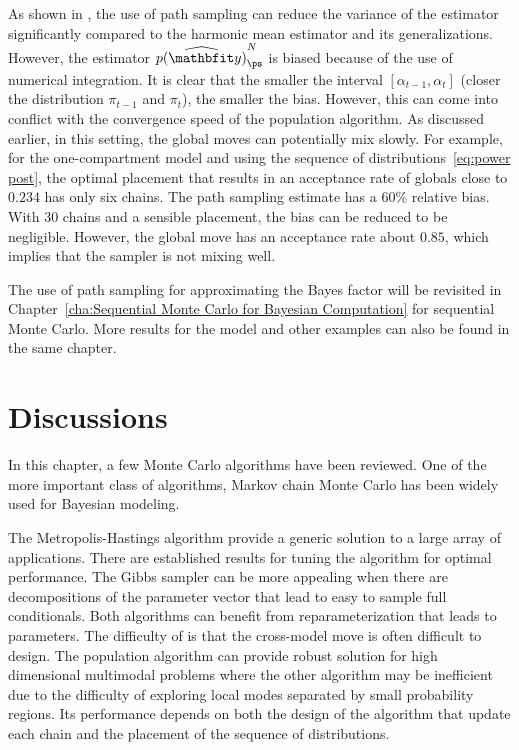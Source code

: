 As shown in \cite{Calderhead:2009bd}, the use of path sampling can reduce the variance of the estimator significantly compared to the harmonic mean estimator and its generalizations. However, the estimator $\widehat{p(\data)}_{\ps}^N$ is biased because of the use of numerical integration. It is clear that the smaller the interval $[\alpha_{t-1},\alpha_t]$ (closer the distribution $\pi_{t-1}$ and $\pi_t$), the smaller the bias. However, this can come into conflict with the convergence speed of the population \mcmc algorithm. As discussed earlier, in this setting, the global moves can potentially mix slowly. For example, for the one-compartment \pet model and using the sequence of distributions~\eqref{eq:power post}, the optimal placement that results in an acceptance rate of globals close to $0.234$ has only six chains. The path sampling estimate has a 60\% relative bias. With 30 chains and a sensible placement, the bias can be reduced to be negligible. However, the global move has an acceptance rate about $0.85$, which implies that the sampler is not mixing well.

The use of path sampling for approximating the Bayes factor will be revisited in Chapter~\ref{cha:Sequential Monte Carlo for Bayesian Computation} for sequential Monte Carlo. More results for the \pet model and other examples can also be found in the same chapter.

\section{Discussions}
\label{sec:Monte Carlo Discussion}

In this chapter, a few Monte Carlo algorithms have been reviewed. One of the more important class of algorithms, Markov chain Monte Carlo has been widely used for Bayesian modeling.

The Metropolis-Hastings algorithm provide a generic solution to a large array of applications. There are established results for tuning the algorithm for optimal performance. The Gibbs sampler can be more appealing when there are decompositions of the parameter vector that lead to easy to sample full conditionals. Both algorithms can benefit from reparameterization that leads to  parameters. The difficulty of \rjmcmc is that the cross-model move is often difficult to design. The population \mcmc algorithm can provide robust solution for high dimensional multimodal problems where the other algorithm may be inefficient due to the difficulty of exploring local modes separated by small probability regions. Its performance depends on both the design of the \mcmc algorithm that update each chain and the placement of the sequence of distributions.

